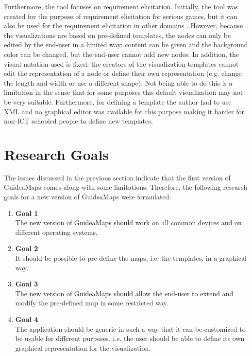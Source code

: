 Furthermore, the tool focuses on requirement elicitation. Initially, the tool was created for the purpose of requirement elicitation for serious games, but it can also be used for the requirement elicitation in other domains \citep{detroyerjanssens}. However, because the visualizations are based on pre-defined templates, the nodes can only be edited by the end-user in a limited way: content can be given and the background color can be changed, but the end-user cannot add new nodes. In addition, the visual notation used is fixed: the creators of the visualization templates cannot edit the representation of a node or define their own representation (e.g. change the length and width or use a different shape). Not being able to do this is a limitation in the sense that for some purposes this default visualization may not be very suitable. Furthermore, for defining a template the author had to use XML and no graphical editor was available for this purpose making it harder for non-ICT schooled people to define new templates.





\section{Research Goals}\label{sec:research-goals}
The issues discussed in the previous section indicate that the first version of GuideaMaps comes along with some limitations. Therefore, the following research goals for a new version of GuideaMaps were formulated:

\begin{enumerate}[label={\textcolor{white}{\arabic*}},ref=\arabic*]
	\item \hspace*{-2.5em}\textbf{Goal 1\label{item:goal:device-os-independent}} \hfill \\
	The new version of GuideaMaps should work on all common devices and on different operating systems.
	
	\item \hspace*{-2.5em}\textbf{Goal 2\label{item:goal:templates}} \hfill \\
	It should be possible to pre-define the maps, i.e. the templates, in a graphical way.
	
	\item \hspace*{-2.5em}\textbf{Goal 3\label{item:goal:extend-modify}} \hfill \\
	The new version of GuideaMaps should allow the end-user to extend and modify the pre-defined map in some restricted way.
	
	\item \hspace*{-2.5em}\textbf{Goal 4\label{item:goal:generic}} \hfill \\
	The application should be generic in such a way that it can be customized to be usable for different purposes, i.e. the user should be able to define its own graphical representation for the visualization.
\end{enumerate}

